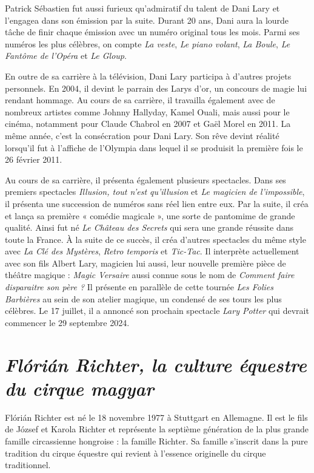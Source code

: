 Patrick Sébastien fut aussi furieux qu’admiratif du talent de Dani Lary et l’engagea dans son émission par la suite. Durant 20 ans, Dani aura la lourde tâche de finir chaque émission avec un numéro original tous les mois. Parmi ses numéros les plus célèbres, on compte \textit{La veste}, \textit{Le piano volant}, \textit{La Boule}, \textit{Le Fantôme de l’Opéra} et \textit{Le Gloup}.

En outre de sa carrière à la télévision, Dani Lary participa à d’autres projets personnels. En 2004, il devint le parrain des Larys d’or, un concours de magie lui rendant hommage. Au cours de sa carrière, il travailla également avec de nombreux artistes comme Johnny Hallyday, Kamel Ouali, mais aussi pour le cinéma, notamment pour Claude Chabrol en 2007 et Gaël Morel en 2011. La même année, c'est la consécration pour Dani Lary. Son rêve devint réalité lorsqu’il fut à l’affiche de l’Olympia dans lequel il se produisit la première fois le 26 février 2011.

Au cours de sa carrière, il présenta également plusieurs spectacles. Dans ses premiers spectacles \textit{Illusion, tout n’est qu’illusion} et \textit{Le magicien de l’impossible}, il présenta une succession de numéros sans réel lien entre eux. Par la suite, il créa et lança sa première « comédie magicale », une sorte de pantomime de grande qualité. Ainsi fut né \textit{Le Château des Secrets} qui sera une grande réussite dans toute la France. À la suite de ce succès, il créa d’autres spectacles du même style avec \textit{La Clé des Mystères}, \textit{Retro temporis} et \textit{Tic-Tac}. Il interprète actuellement avec son fils Albert Lary, magicien lui aussi, leur nouvelle première pièce de théâtre magique : \textit{Magic Versaire} aussi connue sous le nom de \textit{Comment faire disparaitre son père ?} Il présente en parallèle de cette tournée \textit{Les Folies Barbières} au sein de son atelier magique, un condensé de ses tours les plus célèbres. Le 17 juillet, il a annoncé son prochain spectacle \textit{Lary Potter} qui devrait commencer le 29 septembre 2024. 

\section*{\textit{Flórián Richter, la culture équestre du cirque magyar}}
{}
\noindent
Flórián Richter est né le 18 novembre 1977 à Stuttgart en Allemagne. Il est le fils de József et Karola Richter et représente la septième génération de la plus grande famille circassienne hongroise : la famille Richter. Sa famille s’inscrit dans la pure tradition du cirque équestre qui revient à l’essence originelle du cirque traditionnel. 

